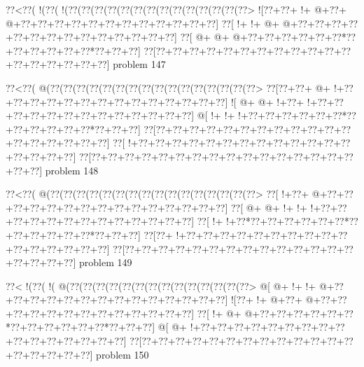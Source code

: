 \vbox{\vbox{\goo
\0??<\0??(\- !(\0??(\- !(\0??(\0??(\0??(\0??(\0??(\0??(\0??(\0??(\0??(\0??(\0??(\0??(\0??(\0??>
\- ![\0??+\0??+\- !+\- @+\0??+\- @+\0??+\0??+\0??+\0??+\0??+\0??+\0??+\0??+\0??+\0??+\0??+\0??]
\0??[\- !+\- !+\- @+\- @+\0??+\0??+\0??+\0??+\0??+\0??+\0??+\0??+\0??+\0??+\0??+\0??+\0??+\0??]
\0??[\- @+\- @+\- @+\0??+\0??+\0??+\0??+\0??+\0??*\0??+\0??+\0??+\0??+\0??+\0??*\0??+\0??+\0??]
\0??[\0??+\0??+\0??+\0??+\0??+\0??+\0??+\0??+\0??+\0??+\0??+\0??+\0??+\0??+\0??+\0??+\0??+\0??]
}
\hfil problem 147\hfil\break
}



\vbox{\vbox{\goo
\0??<\0??(\- @(\0??(\0??(\0??(\0??(\0??(\0??(\0??(\0??(\0??(\0??(\0??(\0??(\0??(\0??(\0??(\0??>
\0??[\0??+\0??+\- @+\- !+\0??+\0??+\0??+\0??+\0??+\0??+\0??+\0??+\0??+\0??+\0??+\0??+\0??+\0??]
\- ![\- @+\- @+\- !+\0??+\- !+\0??+\0??+\0??+\0??+\0??+\0??+\0??+\0??+\0??+\0??+\0??+\0??+\0??]
\- @[\- !+\- !+\- !+\0??+\0??+\0??+\0??+\0??+\0??*\0??+\0??+\0??+\0??+\0??+\0??*\0??+\0??+\0??]
\0??[\0??+\0??+\0??+\0??+\0??+\0??+\0??+\0??+\0??+\0??+\0??+\0??+\0??+\0??+\0??+\0??+\0??+\0??]
\0??[\- !+\0??+\0??+\0??+\0??+\0??+\0??+\0??+\0??+\0??+\0??+\0??+\0??+\0??+\0??+\0??+\0??+\0??]
\0??[\0??+\0??+\0??+\0??+\0??+\0??+\0??+\0??+\0??+\0??+\0??+\0??+\0??+\0??+\0??+\0??+\0??+\0??]
}
\hfil problem 148\hfil\break
}



\vbox{\vbox{\goo
\0??<\0??(\- @(\0??(\0??(\0??(\0??(\0??(\0??(\0??(\0??(\0??(\0??(\0??(\0??(\0??(\0??(\0??(\0??>
\0??[\- !+\0??+\- @+\0??+\0??+\0??+\0??+\0??+\0??+\0??+\0??+\0??+\0??+\0??+\0??+\0??+\0??+\0??]
\0??[\- @+\- @+\- !+\- !+\- !+\0??+\0??+\0??+\0??+\0??+\0??+\0??+\0??+\0??+\0??+\0??+\0??+\0??]
\0??[\- !+\- !+\0??*\0??+\0??+\0??+\0??+\0??+\0??*\0??+\0??+\0??+\0??+\0??+\0??*\0??+\0??+\0??]
\0??[\0??+\- !+\0??+\0??+\0??+\0??+\0??+\0??+\0??+\0??+\0??+\0??+\0??+\0??+\0??+\0??+\0??+\0??]
\0??[\0??+\0??+\0??+\0??+\0??+\0??+\0??+\0??+\0??+\0??+\0??+\0??+\0??+\0??+\0??+\0??+\0??+\0??]
}
\hfil problem 149\hfil\break
}



\vbox{\vbox{\goo
\0??<\- !(\0??(\- !(\- @(\0??(\0??(\0??(\0??(\0??(\0??(\0??(\0??(\0??(\0??(\0??(\0??(\0??(\0??>
\- @[\- @+\- !+\- !+\- @+\0??+\0??+\0??+\0??+\0??+\0??+\0??+\0??+\0??+\0??+\0??+\0??+\0??+\0??]
\- ![\0??+\- !+\- @+\0??+\- @+\0??+\0??+\0??+\0??+\0??+\0??+\0??+\0??+\0??+\0??+\0??+\0??+\0??]
\0??[\- !+\- @+\- @+\0??+\0??+\0??+\0??+\0??+\0??*\0??+\0??+\0??+\0??+\0??+\0??*\0??+\0??+\0??]
\- @[\- @+\- !+\0??+\0??+\0??+\0??+\0??+\0??+\0??+\0??+\0??+\0??+\0??+\0??+\0??+\0??+\0??+\0??]
\0??[\0??+\0??+\0??+\0??+\0??+\0??+\0??+\0??+\0??+\0??+\0??+\0??+\0??+\0??+\0??+\0??+\0??+\0??]
}
\hfil problem 150\hfil\break
}



